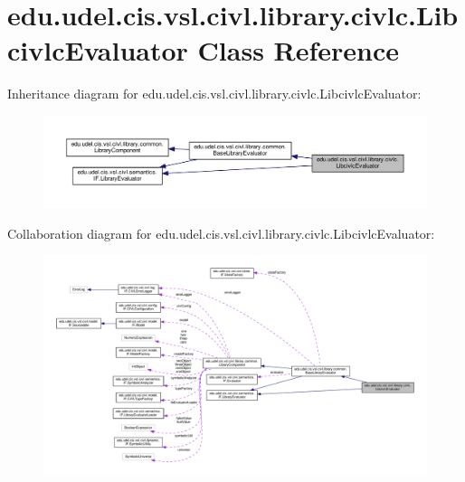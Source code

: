 \hypertarget{classedu_1_1udel_1_1cis_1_1vsl_1_1civl_1_1library_1_1civlc_1_1LibcivlcEvaluator}{}\section{edu.\+udel.\+cis.\+vsl.\+civl.\+library.\+civlc.\+Libcivlc\+Evaluator Class Reference}
\label{classedu_1_1udel_1_1cis_1_1vsl_1_1civl_1_1library_1_1civlc_1_1LibcivlcEvaluator}


Inheritance diagram for edu.\+udel.\+cis.\+vsl.\+civl.\+library.\+civlc.\+Libcivlc\+Evaluator\+:
\nopagebreak
\begin{figure}[H]
\begin{center}
\leavevmode
\includegraphics[width=350pt]{classedu_1_1udel_1_1cis_1_1vsl_1_1civl_1_1library_1_1civlc_1_1LibcivlcEvaluator__inherit__graph}
\end{center}
\end{figure}


Collaboration diagram for edu.\+udel.\+cis.\+vsl.\+civl.\+library.\+civlc.\+Libcivlc\+Evaluator\+:
\nopagebreak
\begin{figure}[H]
\begin{center}
\leavevmode
\includegraphics[width=350pt]{classedu_1_1udel_1_1cis_1_1vsl_1_1civl_1_1library_1_1civlc_1_1LibcivlcEvaluator__coll__graph}
\end{center}
\end{figure}
